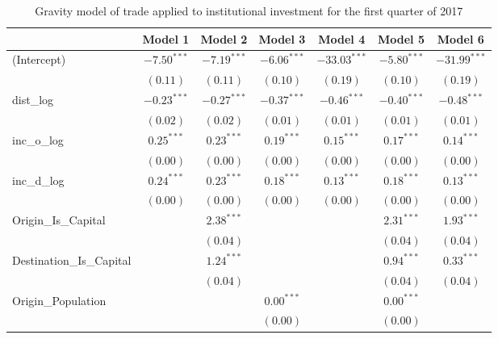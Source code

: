 \begin{table}
	\begin{center}
		\small
		\caption[CGravity Model of Trade for Q1 2017]{Gravity model of trade applied to institutional investment for the first quarter of 2017}
		\begin{tabular}{l c c c c c c }
			\hline
			& Model 1 & Model 2 & Model 3 & Model 4 & Model 5 & Model 6 \\
			\hline
			(Intercept)                  & $-7.50^{***}$ & $-7.19^{***}$ & $-6.06^{***}$ & $-33.03^{***}$ & $-5.80^{***}$ & $-31.99^{***}$ \\
			& $(0.11)$      & $(0.11)$      & $(0.10)$      & $(0.19)$       & $(0.10)$      & $(0.19)$       \\
			dist\_log                    & $-0.23^{***}$ & $-0.27^{***}$ & $-0.37^{***}$ & $-0.46^{***}$  & $-0.40^{***}$ & $-0.48^{***}$  \\
			& $(0.02)$      & $(0.02)$      & $(0.01)$      & $(0.01)$       & $(0.01)$      & $(0.01)$       \\
			inc\_o\_log                  & $0.25^{***}$  & $0.23^{***}$  & $0.19^{***}$  & $0.15^{***}$   & $0.17^{***}$  & $0.14^{***}$   \\
			& $(0.00)$      & $(0.00)$      & $(0.00)$      & $(0.00)$       & $(0.00)$      & $(0.00)$       \\
			inc\_d\_log                  & $0.24^{***}$  & $0.23^{***}$  & $0.18^{***}$  & $0.13^{***}$   & $0.18^{***}$  & $0.13^{***}$   \\
			& $(0.00)$      & $(0.00)$      & $(0.00)$      & $(0.00)$       & $(0.00)$      & $(0.00)$       \\
			Origin\_Is\_Capital          &               & $2.38^{***}$  &               &                & $2.31^{***}$  & $1.93^{***}$   \\
			&               & $(0.04)$      &               &                & $(0.04)$      & $(0.04)$       \\
			Destination\_Is\_Capital     &               & $1.24^{***}$  &               &                & $0.94^{***}$  & $0.33^{***}$   \\
			&               & $(0.04)$      &               &                & $(0.04)$      & $(0.04)$       \\
			Origin\_Population           &               &               & $0.00^{***}$  &                & $0.00^{***}$  &                \\
			&               &               & $(0.00)$      &                & $(0.00)$      &                \\

\end{tabular}
\end{center}
\end{table}
